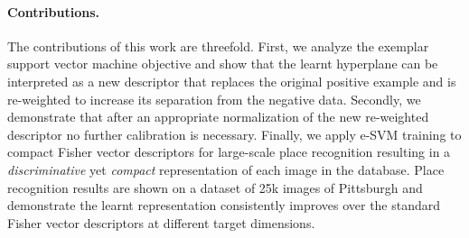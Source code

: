 \documentclass[10pt,twocolumn,letterpaper]{article}
\begin{document}
\paragraph{Contributions.} %
    The contributions of this work are threefold.
    First, we analyze the exemplar support vector machine objective and show that the learnt hyperplane can be interpreted as a new descriptor that replaces the original positive example and is re-weighted to increase its separation from the negative data. Secondly, we demonstrate that after an appropriate normalization of the new re-weighted descriptor no further calibration is necessary. Finally, we apply e-SVM training to compact Fisher vector descriptors for large-scale place recognition resulting in a {\em discriminative} yet {\em compact} representation of each image in the database. Place recognition results are shown on a dataset of 25k images of Pittsburgh and demonstrate the learnt representation consistently improves over the standard Fisher vector descriptors at different target dimensions.
\end{document}
